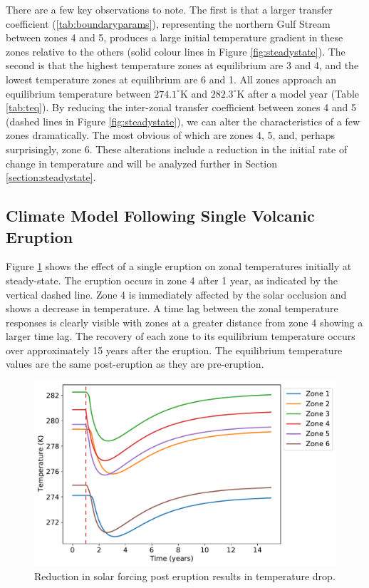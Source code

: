 \documentclass[12pt]{article}
\begin{document}
There are a few key observations to note. The first is that a larger transfer
coefficient (\ref{tab:boundaryparams}), representing the northern Gulf Stream
between zones 4 and 5, produces a large initial temperature gradient in these
zones relative to the others (solid colour lines in Figure
\ref{fig:steadystate}). The second is that the highest temperature zones at
equilibrium are 3 and 4, and the lowest temperature zones at equilibrium are 6
and 1. All zones approach an equilibrium temperature between $274.1^{\circ}$K
and $282.3^{\circ}$K after a model year (Table \ref{tab:teq}). By reducing the
inter-zonal transfer coefficient between zones 4 and 5
(dashed lines in Figure \ref{fig:steadystate}), we can alter the characteristics
of a few zones dramatically. The most obvious of which are zones 4, 5, and,
perhaps surprisingly, zone 6. These alterations include a reduction in the
initial rate of change in temperature and will be analyzed further in Section
\ref{section:steadystate}.

\subsection{Climate Model Following Single Volcanic Eruption}
Figure \ref{fig:oneerupt} shows the effect of a single eruption on zonal 
temperatures initially at steady-state. The eruption occurs in zone 4 after
1 year, as indicated by the vertical dashed line.
Zone 4 is immediately affected by the solar occlusion and shows a decrease
in temperature. A time lag between the zonal temperature responses is clearly
visible with zones at a greater distance from zone 4 showing a larger time lag.
The recovery of each zone to its equilibrium temperature occurs over approximately
15 years after the eruption. The equilibrium temperature values are the same
post-eruption as they are pre-eruption.

\begin{figure}[H]
    \centering
    \includegraphics[scale=0.6]{one_eruption.pdf}
    \caption{
        Reduction in solar forcing post eruption results in temperature drop.
    }
    \label{fig:oneerupt}
\end{figure}
\FloatBarrier
\end{document}

